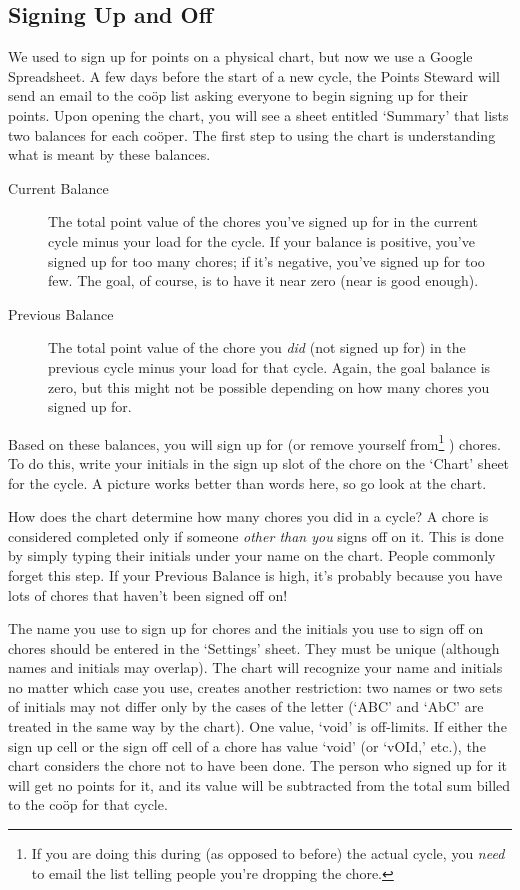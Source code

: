 \documentclass{article}
\begin{document}
\subsection{Signing Up and Off}
We used to sign up for points on a physical chart, but now we use a Google Spreadsheet.
A few days before the start of a new cycle, the Points Steward will send an email to the co\"{o}p list asking everyone to begin signing up for their points. Upon opening the chart, you will see a sheet entitled `Summary' that lists two balances for each co\"{o}per.
The first step to using the chart is understanding what is meant by these balances.

\begin{description}
\item[Current Balance]
The total point value of the chores you've signed up for in the current cycle minus your load for the cycle.
If your balance is positive, you've signed up for too many chores; if it's negative, you've signed up for too few.
The goal, of course, is to have it near zero (near is good enough).
\item[Previous Balance]
The total point value of the chore you \emph{did} (not signed up for) in the previous cycle minus your load for that cycle.
Again, the goal balance is zero, but this might not be possible depending on how many chores you signed up for.
\end{description}


Based on these balances, you will sign up for (or remove yourself from\footnote{%
If you are doing this during (as opposed to before) the actual cycle, you \emph{need} to email the list telling people you're dropping the chore.%
}%
) chores.
To do this, write your initials in the sign up slot of the chore on the `Chart' sheet for the cycle.
A picture works better than words here, so go look at the chart.


How does the chart determine how many chores you did in a cycle?
A chore is considered completed only if someone \emph{other than you} signs off on it.
This is done by simply typing their initials under your name on the chart.
People commonly forget this step.
If your Previous Balance is high, it's probably because you have lots of chores that haven't been signed off on!

The name you use to sign up for chores and the initials you use to sign off on chores should be entered in the `Settings' sheet.
They must be unique (although names and initials may overlap).
The chart will recognize your name and initials no matter which case you use, creates another restriction: two names or two sets of initials may not differ only by the cases of the letter (`ABC' and `AbC' are treated in the same way by the chart).
One value, `void' is off-limits.
If either the sign up cell or the sign off cell of a chore has value `void' (or `vOId,' etc.), the chart considers the chore not to have been done.
The person who signed up for it will get no points for it, and its value will be subtracted from the total sum billed to the co\"{o}p for that cycle.
\end{document}
